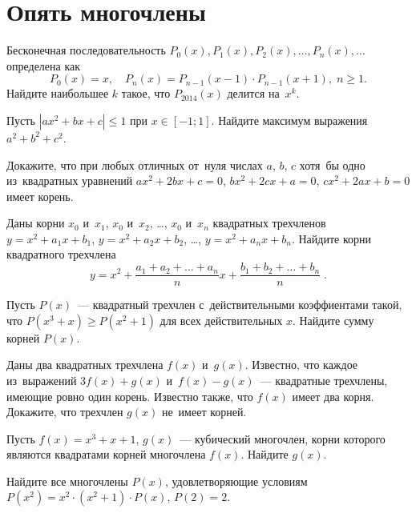 
\section*{Опять многочлены}


\begin{problems}

\item
Бесконечная последовательность
$P_0(x), P_1(x), P_2(x), \ldots, P_n(x), \ldots$
определена как
\[
    P_0(x) = x
,\quad
    P_n(x) = P_{n-1}(x - 1) \cdot P_{n-1}(x + 1)
,\;
    n \geq 1
.\]
Найдите наибольшее $k$ такое, что $P_{2014}(x)$ делится на~$x^k$.

\item
Пусть $|a x^2 + b x + c| \leq 1$ при $x \in [-1; 1]$.
Найдите максимум выражения $a^2 + b^2 + c^2$.

\item
Докажите, что при любых отличных от~нуля числах $a$, $b$, $c$ хотя~бы одно
из~квадратных уравнений
$a x^2 + 2 b x + c = 0$, $b x^2 + 2 c x + a = 0$, $c x^2 + 2 a x + b = 0$
имеет корень.

\item
Даны корни $x_0$ и~$x_1$, $x_0$ и~$x_2$, \ldots, $x_0$ и~$x_n$ квадратных
трехчленов
$y = x^2 + a_1 x + b_1$, $y = x^2 + a_2 x + b_2$, \ldots,
$y = x^2 + a_n x + b_n$.
Найдите корни квадратного трехчлена
\[
    y
=
    x^2
    +
    \frac{a_1 + a_2 + \ldots + a_n}{n} x
    +
    \frac{b_1 + b_2 + \ldots + b_n}{n}
\;.\]

\item
Пусть $P(x)$~--- квадратный трехчлен с~действительными коэффиентами такой, что
$P(x^3 + x) \geq P(x^2 + 1)$ для всех действительных $x$.
Найдите сумму корней $P(x)$.

\item
Даны два квадратных трехчлена $f(x)$ и~$g(x)$.
Известно, что каждое из~выражений $3 f(x) + g(x)$ и~$f(x) - g(x)$~---
квадратные трехчлены, имеющие ровно один корень.
Известно также, что $f(x)$ имеет два корня.
Докажите, что трехчлен $g(x)$ не~имеет корней.

\item
Пусть $f(x) = x^3 + x + 1$, $g(x)$~--- кубический многочлен, корни которого
являются квадратами корней многочлена $f(x)$.
Найдите $g(x)$.

\item
Найдите все многочлены $P(x)$, удовлетворяющие условиям
$P(x^2) = x^2 \cdot (x^2 + 1) \cdot P(x)$, $P(2) = 2$.

\end{problems}

